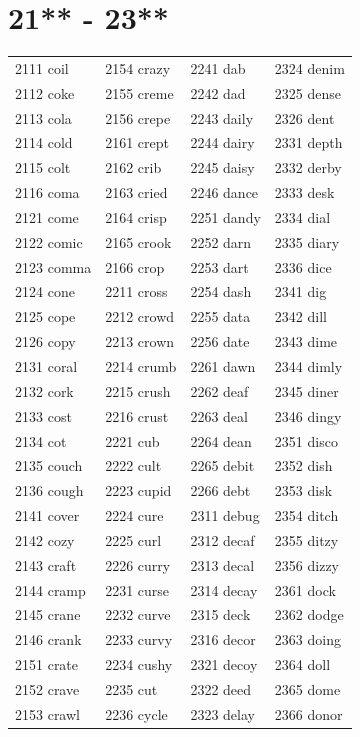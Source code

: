 \documentclass[12pt, oneside]{book}
\begin{document}
	\begin{table}[h]
		\centering
		\section*{21** - 23**}
		\begin{tabular}{l l l l}
			2111 coil & 2154 crazy & 2241 dab & 2324 denim\\
			2112 coke & 2155 creme & 2242 dad & 2325 dense\\
			2113 cola & 2156 crepe & 2243 daily & 2326 dent\\
			2114 cold & 2161 crept & 2244 dairy & 2331 depth\\
			2115 colt & 2162 crib & 2245 daisy & 2332 derby\\
			2116 coma & 2163 cried & 2246 dance & 2333 desk\\
			2121 come & 2164 crisp & 2251 dandy & 2334 dial\\
			2122 comic & 2165 crook & 2252 darn & 2335 diary\\
			2123 comma & 2166 crop & 2253 dart & 2336 dice\\
			2124 cone & 2211 cross & 2254 dash & 2341 dig\\
			2125 cope & 2212 crowd & 2255 data & 2342 dill\\
			2126 copy & 2213 crown & 2256 date & 2343 dime\\
			2131 coral & 2214 crumb & 2261 dawn & 2344 dimly\\
			2132 cork & 2215 crush & 2262 deaf & 2345 diner\\
			2133 cost & 2216 crust & 2263 deal & 2346 dingy\\
			2134 cot & 2221 cub & 2264 dean & 2351 disco\\
			2135 couch & 2222 cult & 2265 debit & 2352 dish\\
			2136 cough & 2223 cupid & 2266 debt & 2353 disk\\
			2141 cover & 2224 cure & 2311 debug & 2354 ditch\\
			2142 cozy & 2225 curl & 2312 decaf & 2355 ditzy\\
			2143 craft & 2226 curry & 2313 decal & 2356 dizzy\\
			2144 cramp & 2231 curse & 2314 decay & 2361 dock\\
			2145 crane & 2232 curve & 2315 deck & 2362 dodge\\
			2146 crank & 2233 curvy & 2316 decor & 2363 doing\\
			2151 crate & 2234 cushy & 2321 decoy & 2364 doll\\
			2152 crave & 2235 cut & 2322 deed & 2365 dome\\
			2153 crawl & 2236 cycle & 2323 delay & 2366 donor\\
		\end{tabular}
	\end{table}
	
\end{document}
